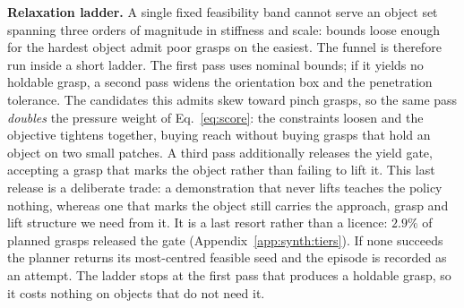 \noindent\textbf{Relaxation ladder.}
A single fixed feasibility band cannot serve an object set spanning three orders of magnitude in
stiffness and scale: bounds loose enough for the hardest object admit poor grasps on the
easiest. The funnel is therefore run inside a short ladder. The first pass uses nominal bounds;
if it yields no holdable grasp, a second pass widens the orientation box and the penetration
tolerance. The candidates this admits skew toward pinch grasps, so the same pass \emph{doubles}
the pressure weight of Eq.~\eqref{eq:score}: the constraints loosen and the objective tightens
together, buying reach without buying grasps that hold an object on two small patches. A third
pass additionally releases the yield gate, accepting a grasp that marks the object rather than
failing to lift it. This last release is a deliberate trade: a demonstration that never lifts
teaches the policy nothing, whereas one that marks the object still carries the approach, grasp
and lift structure we need from it. It is a last resort rather than a licence: $2.9\%$ of
planned grasps released the gate (Appendix~\ref{app:synth:tiers}). If none succeeds the planner
returns its most-centred feasible seed and the episode is recorded as an attempt. The ladder
stops at the first pass that produces a holdable grasp, so it costs nothing on objects that do
not need it.

